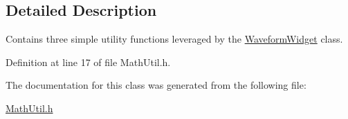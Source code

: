 \subsection{Detailed Description}
Contains three simple utility functions leveraged by the \hyperlink{classWaveformWidget}{WaveformWidget} class. 

Definition at line 17 of file MathUtil.h.

The documentation for this class was generated from the following file:\begin{DoxyCompactItemize}
\item 
\hyperlink{MathUtil_8h}{MathUtil.h}\end{DoxyCompactItemize}
